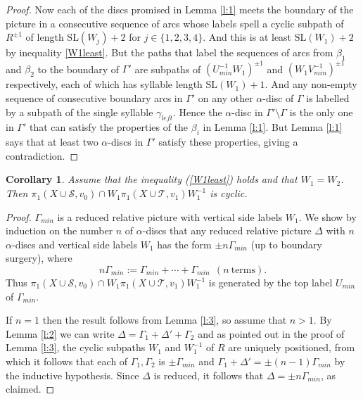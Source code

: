 \documentclass[12pt,a4paper]{amsart}
\def\G{\Gamma}
\def\D{\Delta}
\def\a{\alpha}
\def\b{\beta}
\def\g{\gamma}
\def\cS{\mathcal{S}}
\def\cT{\mathcal{T}}
\newtheorem{cor}[thm]{Corollary}
\begin{document}
\begin{proof}
		Now each of the discs promised in Lemma \ref{l:1} meets the boundary of the picture in a consecutive sequence of arcs whose labels spell a cyclic subpath of $R^{\pm1}$ of length $\text{SL}(W_j)+2$ for $j\in\{1,2,3,4\}$. And this is at least $\text{SL}(W_1)+2$ by inequality \eqref{W1least}. But the paths that label the sequences of arcs from $\b_1$ and $\b_2$ to the boundary of $\G'$ are subpaths of $(U_{min}^{-1}W_1)^{\pm1}$
		and $(W_1V_{min}^{-1})^{\pm1}$ respectively, each of which has syllable length $\text{SL}(W_1)+1$.   And any non-empty sequence of consecutive boundary arcs in  $\G'$ on any other $\a$-disc of $\G$ is labelled by a subpath of the single syllable $\g_{left}$.  Hence the $\a$-disc in $\G'\setminus \G$ is the only one in $\G'$ that can satisfy the properties of the $\b_i$ in Lemma \ref{l:1}.   But Lemma \ref{l:1} says that at least two $\a$-discs in $\G'$ satisfy these properties,
		giving a contradiction.
\end{proof}




 

\begin{cor}\label{W1W2}
	Assume that the inequality (\ref{W1least}) holds and that $W_1=W_2$.   
	Then  $\pi_1(X\cup\cS,v_0)\cap W_1\pi_1(X\cup\cT,v_1)W_1^{-1}$ is cyclic.
\end{cor}

\begin{proof}
	$\G_{min}$ is a reduced relative  picture 
	with vertical side  labels  $W_1$.  
	We show by induction on the number $n$ of $\a$-discs that any reduced relative  picture  
	$\D$ with $n$ $\a$-discs and vertical side  labels $W_1$ has the form $\pm n\G_{min}$ (up to boundary surgery), where  
	$$n\G_{min}:=\G_{min}+\cdots+\G_{min}~~(n~\mathrm{terms}).$$
	Thus $\pi_1(X\cup\cS,v_0)\cap W_1\pi_1(X\cup\cT,v_1)W_1^{-1}$ is generated by the top label $U_{min}$ of $\G_{min}$.
	
	If $n=1$ then the result follows from Lemma \ref{l:3}, so assume that $n>1$.  
	By Lemma \ref{l:2} we can write  $\D  = \G_1+\D'+\G_2$ 
	and as pointed out in the proof of Lemma \ref{l:3}, the {cyclic subpaths} 
	$W_1$ and $W_1^{-1}$ of $R$ are uniquely positioned, 
	from which it follows that each of $\G_1,\G_2$ is  $\pm\G_{min}$ and  
	$\G_1+\D'=\pm (n-1)\G_{min}$ by the inductive hypothesis.   
	Since $\D$ is reduced, it follows that $\D=\pm n\G_{min}$, as claimed.
\end{proof}
\end{document}
